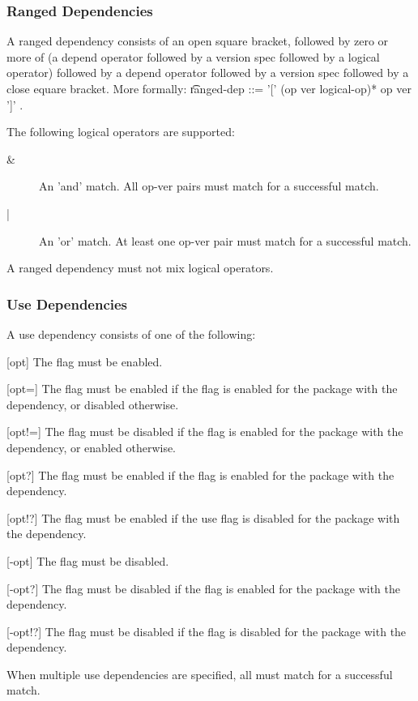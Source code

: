 \IFKDEBUILDELSE
{
    \subsubsection{Ranged Dependencies}
    \label{range-dep}

    A ranged dependency consists of an open square bracket, followed by zero or more of (a depend
    operator followed by a version spec followed by a logical operator) followed by a depend
    operator followed by a version spec followed by a close equare bracket. More formally:
    \t{ranged-dep ::= '[' (op ver logical-op)* op ver ']' }.

    The following logical operators are supported:

    \begin{description}
    \item[\&] An 'and' match. All op-ver pairs must match for a successful match.
    \item[|] An 'or' match. At least one op-ver pair must match for a successful match.
    \end{description}

    A ranged dependency must not mix logical operators.
}{
}

\IFKDEBUILDELSE
{
    \subsubsection{Use Dependencies}
    \label{use-dep}

    A use dependency consists of one of the following:

    \begin{description}
    \item{[opt]} The flag must be enabled.
    \item{[opt=]} The flag must be enabled if the flag is enabled for the package with the
        dependency, or disabled otherwise.
    \item{[opt!=]} The flag must be disabled if the flag is enabled for the package with the
        dependency, or enabled otherwise.
    \item{[opt?]} The flag must be enabled if the flag is enabled for the package with the
        dependency.
    \item{[opt!?]} The flag must be enabled if the use flag is disabled for the package with the
        dependency.
    \item{[-opt]} The flag must be disabled.
    \item{[-opt?]} The flag must be disabled if the flag is enabled for the package with the
        dependency.
    \item{[-opt!?]} The flag must be disabled if the flag is disabled for the package with the
        dependency.
    \end{description}

    When multiple use dependencies are specified, all must match for a successful match.
}{
}

